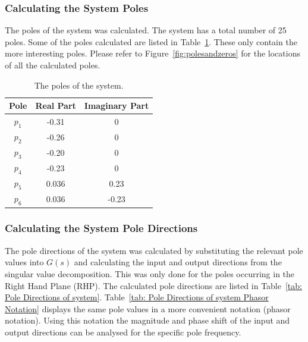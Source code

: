 \subsubsection{Calculating the System Poles}

The poles of the system was calculated. The system has a total  number of 25 poles. Some of the poles calculated are listed in Table~\ref{tab: Poles of system}. These only contain the more interesting poles. Please refer to Figure~\ref{fig:polesandzeros} for the locations of all the calculated poles.

\begin{table}[H]
	\centering
	\caption{The poles of the system.}
	\begin{tabular}{ccc}
		\hline
		\textbf{Pole} & \textbf{Real Part} & \textbf{Imaginary Part} \\\hline
		$p_1$            & -0.31            & 0                       \\
		$p_2$            & -0.26            & 0                       \\
		$p_3$            & -0.20            & 0                 \\
		$p_4$            & -0.23            & 0                 \\
		$p_5$            & 0.036             & 0.23                  \\
		$p_6$            & 0.036             & -0.23   \\\hline             
	\end{tabular}
	\label{tab: Poles of system}
\end{table}

\subsubsection{Calculating the System Pole Directions}
\label{sec:Pole Directions}

The pole directions of the system was calculated by substituting the relevant pole values into $G(s)$ and calculating the input and output directions from the singular value decomposition. This was only done for the poles occurring in the Right Hand Plane (RHP). The calculated pole directions are listed in Table~\ref{tab: Pole Directions of system}. Table~\ref{tab: Pole Directions of system Phasor Notation} displays the same pole values in a more convenient notation (phasor notation). Using this notation the magnitude and phase shift of the input and output directions can be analysed for the specific pole frequency.

